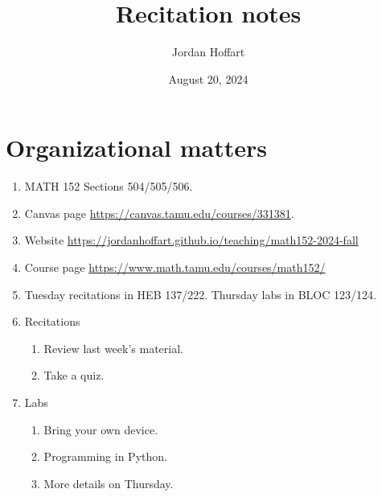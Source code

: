 \documentclass{article}
\title{Recitation notes}
\author{Jordan Hoffart}
\date{August 20, 2024}
\theoremstyle{plain}
\begin{document}
\theoremstyle{definition}
\newtheorem{definition}{Definition}
\newtheorem{example}{Example}
\maketitle
\section{Organizational matters}
\begin{enumerate}
	\item MATH 152 Sections 504/505/506.
	\item Canvas page \url{https://canvas.tamu.edu/courses/331381}.
	\item Website \url{https://jordanhoffart.github.io/teaching/math152-2024-fall}
	\item Course page \url{https://www.math.tamu.edu/courses/math152/}
	\item Tuesday recitations in HEB 137/222.
	      Thursday labs in BLOC 123/124.
	\item Recitations
	      \begin{enumerate}
		      \item Review last week's material.
		      \item Take a quiz.
	      \end{enumerate}
	\item Labs
	      \begin{enumerate}
		      \item Bring your own device.
		      \item Programming in Python.
		      \item More details on Thursday.
	      \end{enumerate}
\end{enumerate}
\end{document}
